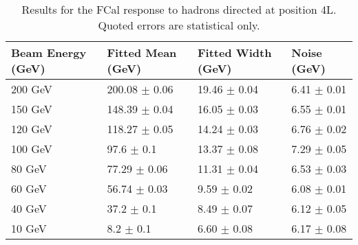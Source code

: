 \begin{table}[!htb]
\begin{center}
\begin{tabular}{|l|l|l|l|}
\hline
Beam Energy (GeV) & Fitted Mean (GeV)& Fitted Width (GeV)& Noise (GeV) \\
\hline
200 GeV  &  200.08 $\pm$    0.06 &   19.46 $\pm$    0.04 &    6.41 $\pm$    0.01 \\
150 GeV  &  148.39 $\pm$    0.04 &   16.05 $\pm$    0.03 &    6.55 $\pm$    0.01 \\
120 GeV  &  118.27 $\pm$    0.05 &   14.24 $\pm$    0.03 &    6.76 $\pm$    0.02 \\
100 GeV  &   97.6 $\pm$    0.1 &   13.37 $\pm$    0.08 &    7.29 $\pm$    0.05 \\
80 GeV  &   77.29 $\pm$    0.06 &   11.31 $\pm$    0.04 &    6.53 $\pm$    0.03 \\
60 GeV  &   56.74 $\pm$    0.03 &    9.59 $\pm$    0.02 &    6.08 $\pm$    0.01 \\
40 GeV  &   37.2 $\pm$    0.1 &    8.49 $\pm$    0.07 &    6.12 $\pm$    0.05 \\
10 GeV  &    8.2 $\pm$    0.1 &    6.60 $\pm$    0.08 &    6.17 $\pm$    0.08 \\
\hline
\end{tabular}
\end{center}
\caption{Results for the FCal response to hadrons directed at position 4L. Quoted errors are statistical only.}
\label{TBres_table_hadron_4L}
\end{table}
